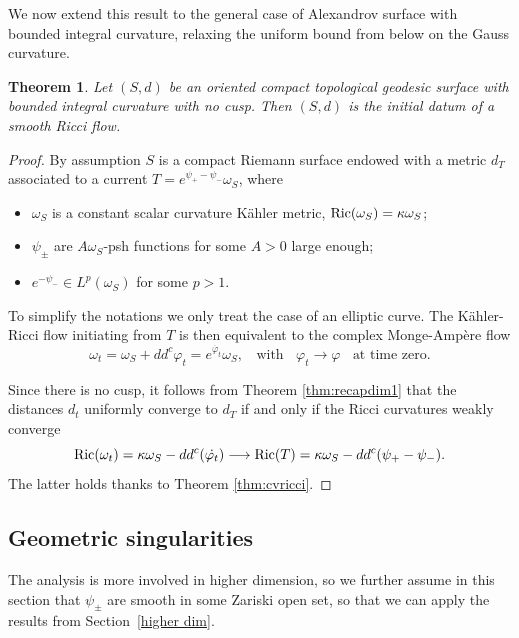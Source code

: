 \documentclass[a4paper,11pt,leqno,english]{smfart}
\theoremstyle{plain}
\newtheorem{thm}{Theorem}[section]
\theoremstyle{plain}
\numberwithin{equation}{section} %
\numberwithin{figure}{section} %
\theoremstyle{plain}
\theoremstyle{plain}
\theoremstyle{remark}
\theoremstyle{remark}
\theoremstyle{definition}
\theoremstyle{plain}
\theoremstyle{plain}
\theoremstyle{definition}
\newcommand{\f}{\varphi}
\newcommand{\p}{\psi}
\begin{document}
 We now extend this result to the general case of Alexandrov surface with bounded 
 integral curvature, relaxing the uniform bound from below on the Gauss curvature.

 

\begin{thm} \label{thm:fkr1dim}
Let $(S,d)$ be an oriented compact topological geodesic surface with  bounded integral curvature 
with no cusp.
Then $(S,d)$ is the initial datum of a smooth Ricci flow. 
\end{thm}


\begin{proof}
By assumption $S$ is a compact Riemann surface endowed with a metric $d_{T}$ associated
to a current $T=e^{\p_+-\p_-} \omega_S$, where 
\begin{itemize}
\item[$\bullet$] $\omega_S$ is a constant scalar curvature K\"ahler metric, ${\rm Ric}(\omega_S)=\kappa \omega_S$;
\item[$\bullet$] $\p_{\pm}$ are $A\omega_S$-psh functions for some $A>0$ large enough;
\item[$\bullet$]  $e^{-\p_-} \in L^p(\omega_S)$ for some $p>1$.
 \end{itemize}

To simplify the notations  we only treat the case of an elliptic curve. 
The K\"ahler-Ricci flow initiating from $T$ is then equivalent
to the complex Monge-Amp\`ere flow 
$$
\omega_t=\omega_S+dd^c \f_t=e^{\dot{\f_t}} \omega_S,
\; \; \text{ with } \; \; 
\f_t \rightarrow \f
\; \; \text{  at time zero}.
$$


Since there is no cusp, it follows from Theorem \ref{thm:recapdim1} that the distances $d_{t}$
uniformly converge to $d_{T}$ if and only if the Ricci curvatures weakly converge
$$
{\rm Ric}(\omega_t)=\kappa \omega_S-dd^c (\dot{\f_t}) 
\longrightarrow {\rm Ric}(T)=\kappa \omega_S-dd^c(\p_+-\p_-).
$$
The latter holds thanks to  Theorem \ref{thm:cvricci}.
\end{proof}

  
  
  
  
  \subsection{Geometric singularities}


The analysis is    more involved in higher dimension, so we 
further assume in this section that 
$\p_{\pm}$ are smooth in some Zariski open set, so 
that we can apply the results from Section~\ref{higher dim}.
\end{document}
